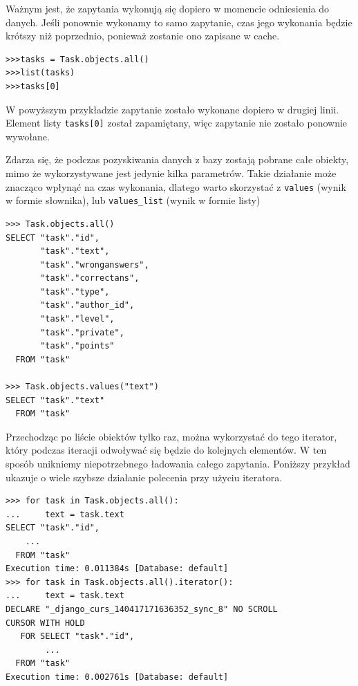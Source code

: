 \documentclass[oneside,polski,logo,indent]{amuthesis}
\begin{document}
Ważnym jest, że zapytania wykonują się dopiero w momencie odniesienia do danych. Jeśli ponownie wykonamy to samo zapytanie, czas jego wykonania będzie krótszy niż poprzednio, ponieważ zostanie ono zapisane w cache.
\begin{lstlisting}[style=DOS]
>>>tasks = Task.objects.all()
>>>list(tasks)
>>>tasks[0]
\end{lstlisting}
W powyższym przykładzie zapytanie zostało wykonane dopiero w drugiej linii. Element listy \texttt{tasks[0]} został zapamiętany, więc zapytanie nie zostało ponownie wywołane.

Zdarza się, że podczas pozyskiwania danych z bazy zostają pobrane całe obiekty, mimo że wykorzystywane jest jedynie kilka parametrów. Takie działanie może znacząco wpłynąć na czas wykonania, dlatego warto skorzystać z \texttt{values} (wynik w formie słownika), lub \texttt{values\_list} (wynik w formie listy)
\begin{lstlisting}[style=DOS]
>>> Task.objects.all()
SELECT "task"."id",
       "task"."text",
       "task"."wronganswers",
       "task"."correctans",
       "task"."type",
       "task"."author_id",
       "task"."level",
       "task"."private",
       "task"."points"
  FROM "task"

>>> Task.objects.values("text")
SELECT "task"."text"
  FROM "task"
\end{lstlisting}
Przechodząc po liście obiektów tylko raz, można wykorzystać do tego iterator, który podczas iteracji odwoływać się będzie do kolejnych elementów. W ten sposób unikniemy niepotrzebnego ładowania całego zapytania. Poniższy przykład ukazuje o wiele szybsze działanie polecenia przy użyciu iteratora.
\begin{lstlisting}[style=DOS]
>>> for task in Task.objects.all():
...     text = task.text
SELECT "task"."id",
	...
  FROM "task"
Execution time: 0.011384s [Database: default]
>>> for task in Task.objects.all().iterator():
...     text = task.text
DECLARE "_django_curs_140417171636352_sync_8" NO SCROLL
CURSOR WITH HOLD
   FOR SELECT "task"."id",
		...
  FROM "task"
Execution time: 0.002761s [Database: default]
\end{lstlisting}
\end{document}

